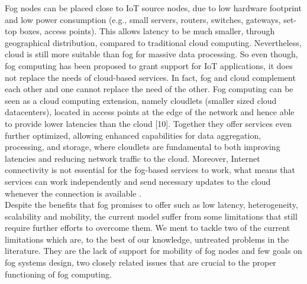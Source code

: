 Fog nodes can be placed close to IoT source nodes, due to low hardware footprint and low power consumption (e.g., small servers, routers, switches, gateways, set-top boxes, access points). This allows latency to be much smaller, through geographical distribution, compared to traditional cloud computing. Nevertheless, cloud is still more suitable than fog for massive data processing. So even though, fog computing has been proposed to grant support for IoT applications, it does not replace the needs of cloud-based services. In fact, fog and cloud complement each other and one cannot replace the need of the other. Fog computing can be seen as a cloud computing extension, namely cloudlets (smaller sized cloud datacenters), located in access points at the edge of the network and hence able to provide lower latencies than the cloud [10]. Together they offer services even further optimized, allowing enhanced capabilities for data aggregation, processing, and storage, where cloudlets are fundamental to both improving latencies and reducing network traffic to the cloud. Moreover, Internet connectivity is not essential for the fog-based services to work, what means that services can work independently and send necessary updates to the cloud whenever the connection is available \cite{yousefpour2018all}.\\
\noindent\tab Despite the benefits that fog promises to offer such as low latency, heterogeneity, scalability and mobility, the current model suffer from some limitations that still require further efforts to overcome them. 
We ment to tackle two of the current limitations which are, to the best of our knowledge, untreated problems in the literature. They are the lack of support for mobility of fog nodes and few goals on fog systems design, two closely related issues that are crucial to the proper functioning of fog computing.\\
